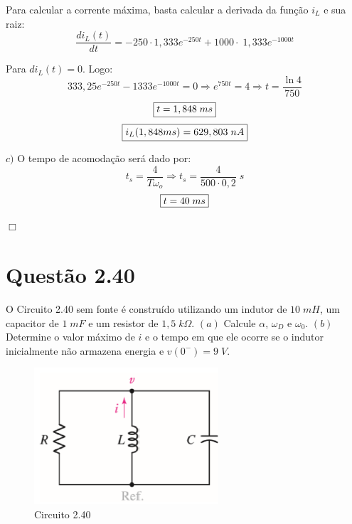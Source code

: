 \documentclass[
	12pt,				%
	oneside,			%
	a4paper,			%
	english,			%
	french,				%
	spanish,			%
	brazil				%
	]{abntex2}
\begin{document}
Para calcular a corrente máxima, basta calcular a derivada da função $i_L$ e sua raiz:
$$\dfrac{di_L(t)}{dt}=-250\cdot1,333e^{-250t}+1000\cdot\;1,333e^{-1000t}$$

Para $di_L(t)=0$. Logo:
$$333,25e^{-250t}-1333e^{-1000t}=0 \Longrightarrow e^{750t}=4 \Longrightarrow t=\dfrac{\ln{4}}{750}$$
\begin{equation}
    \fbox{$t=1,848\;ms$}
\end{equation}
\begin{equation}
    \fbox{$i_L(1,848ms)=629,803\;nA$}
\end{equation}

$c)$ O tempo de acomodação será dado por:
$$t_s=\dfrac{4}{T\omega_o} \Longrightarrow t_s=\dfrac{4}{500\cdot0,2}\;s$$
\begin{equation}
    \fbox{$t=40\;ms$}
\end{equation}

\begin{flushright}
    $\Box$
\end{flushright}
\newpage


\section*{Questão 2.40}
O Circuito 2.40 sem fonte é construído utilizando um indutor de $10\;mH$, um capacitor de $1\;mF$ e um resistor de $1,5\;k\Omega$. $(a)$ Calcule $\alpha$, $\omega_D$ e $\omega_0$. $(b)$ Determine o valor máximo de $i$ e o tempo em que ele ocorre se o indutor inicialmente não armazena energia e $v(0^-)=9\;V$. 
\begin{figure}[htb]
	\centering
	\includegraphics[scale=0.8]{2-40.PNG}
	\caption{Circuito 2.40}
\end{figure}
\end{document}
